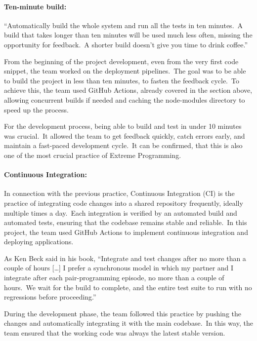\paragraph{Ten-minute build:} ``Automatically build the whole system and run all the tests in ten minutes.\ A build that takes longer than ten minutes will be used much less often, missing the opportunity for feedback.\ A shorter build doesn't give you time to drink coffee.''\cite[Extreme Programming]{xp}

From the beginning of the project development, even from the very first code snippet, the team worked on the deployment pipelines.\ The goal was to be able to build the project in less than ten minutes, to fasten the feedback cycle.\ To achieve this, the team used GitHub Actions, already covered in the section above, allowing concurrent builds if needed and caching the node-modules directory to speed up the process.

For the development process, being able to build and test in under 10 minutes was crucial.\ It allowed the team to get feedback quickly, catch errors early, and maintain a fast-paced development cycle.\ It can be confirmed, that this is also one of the most crucial practice of Extreme Programming.

\paragraph{Continuous Integration:} In connection with the previous practice, Continuous Integration (CI) is the practice of integrating code changes into a shared repository frequently, ideally multiple times a day.\ Each integration is verified by an automated build and automated tests, ensuring that the codebase remains stable and reliable.\ In this project, the team used GitHub Actions to implement continuous integration and deploying applications.

As Ken Beck said in his book, ``Integrate and test changes after no more than a couple of hours [\ldots] I prefer a synchronous model in which my partner and I integrate after each pair-programming episode, no more than a couple of hours.\ We wait for the build to complete, and the entire test suite to run with no regressions before proceeding.''\cite[Extreme Programming]{xp}

During the development phase, the team followed this practice by pushing the changes and automatically integrating it with the main codebase.\ In this way, the team ensured that the working code was always the latest stable version.

